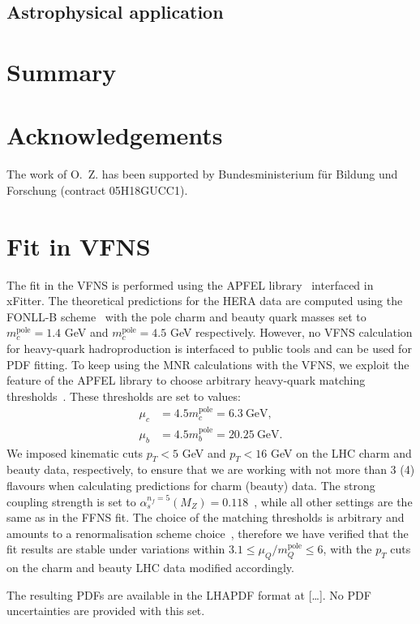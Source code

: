 \documentclass[12pt]{article}
\begin{document}
\subsection{Astrophysical application}
\label{sec:astro}

\section{Summary}
\label{sec:summary}

\section*{Acknowledgements}

The work of O.~Z. has been supported by Bundesministerium f\"ur Bildung und Forschung (contract 05H18GUCC1).





\clearpage
\appendix
\section{Fit in VFNS}
\label{sec:vfns}

The fit in the VFNS is performed using the APFEL library~\cite{Bertone:2013vaa} interfaced in xFitter.
The theoretical predictions for the HERA data are computed using the FONLL-B scheme~\cite{Forte:2010ta} with the pole charm and beauty quark masses set to $m_c^{\textrm{pole}} = 1.4$ GeV and $m_c^{\textrm{pole}} = 4.5$ GeV respectively.
However, no VFNS calculation for heavy-quark hadroproduction is interfaced to public tools and can be used for PDF fitting.
To keep using the MNR calculations with the VFNS, we exploit the feature of the APFEL library to choose arbitrary heavy-quark matching thresholds~\cite{Bertone:2017ehk}. These thresholds are set to values:
\begin{equation}
\begin{aligned}
\mu_c &= 4.5m_c^{\textrm{pole}} = 6.3~\textrm{GeV},\\
\mu_b &= 4.5m_b^{\textrm{pole}} =  20.25~\textrm{GeV}.
\end{aligned}
\end{equation}
We imposed kinematic cuts $p_T < 5$ GeV and $p_T < 16$ GeV on the LHC charm and beauty data, respectively, to ensure that we are working with not more than 3 (4) flavours when calculating predictions for charm (beauty) data. The strong coupling strength is set to $\alpha_s^{n_f = 5}(M_Z) = 0.118$~\cite{Tanabashi:2018oca}, while all other settings are the same as in the FFNS fit.
The choice of the matching thresholds is arbitrary and amounts to a renormalisation scheme choice~\cite{Bertone:2017ehk}, therefore we have verified that the fit results are stable under variations within $3.1 \le \mu_Q/m_Q^{\textrm{pole}} \le 6$, with the $p_T$ cuts on the charm and beauty LHC data modified accordingly.

The resulting PDFs are available in the LHAPDF format at [\dots]. No PDF uncertainties are provided with this set.
\end{document}
